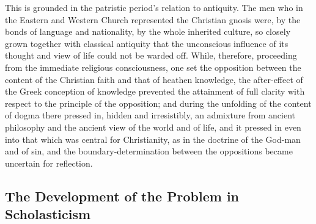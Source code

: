 \documentclass[12pt,a4paper]{book}
\begin{document}
This is grounded in the patristic period's relation to antiquity. The men
who in the Eastern and Western Church represented the Christian gnosis were,
by the bonds of language and nationality, by the whole inherited culture, so
closely grown together with classical antiquity that the unconscious
influence of its thought and view of life could not be warded off. While,
therefore, proceeding from the immediate religious consciousness, one set the
opposition between the content of the Christian faith and that of heathen
knowledge, the after-effect of the Greek conception of knowledge prevented
the attainment of full clarity with respect to the principle of the
opposition; and during the unfolding of the content of dogma there pressed
in, hidden and irresistibly, an admixture from ancient philosophy and the
ancient view of the world and of life, and it pressed in even into that
which was central for Christianity, as in the doctrine of the God-man and of
sin, and the boundary-determination between the oppositions became uncertain
for reflection.

\subsection{The Development of the Problem in Scholasticism}
\label{ssec:scholasticism}
\end{document}
